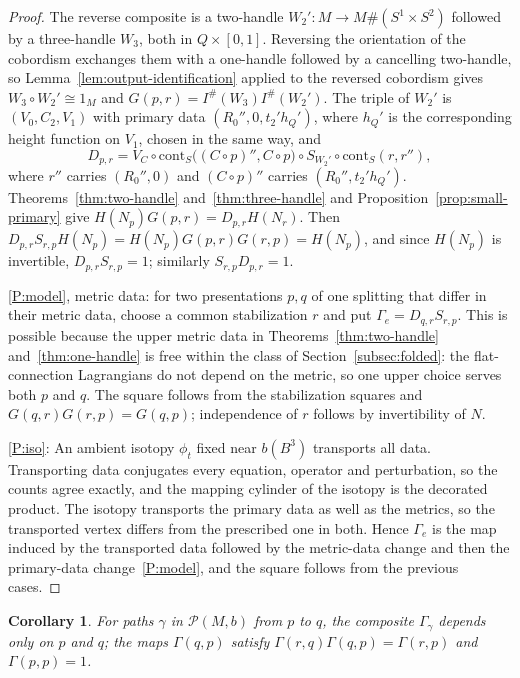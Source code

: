 \documentclass[11pt]{amsart}
\newtheorem{corollary}[theorem]{Corollary}
\theoremstyle{definition}
\theoremstyle{remark}
\theoremstyle{plain}
\numberwithin{equation}{section}
\newcommand{\cP}{\mathcal{P}}
\newcommand{\Ish}{I^{\#}}
\begin{document}
\begin{proof}
The reverse composite is a two-handle $W_2'\colon M\to M\#(S^1\times S^2)$
followed by a three-handle $W_3$, both in $Q\times[0,1]$. Reversing the
orientation of the cobordism exchanges them with a one-handle followed by a
cancelling two-handle, so Lemma~\ref{lem:output-identification} applied to the
reversed cobordism gives $W_3\circ W_2'\cong1_M$ and $G(p,r)=\Ish(W_3)\Ish(W_2')$.
The triple of $W_2'$ is $(V_0,C_2,V_1)$ with primary data $(R_0'',0,t_2'h_Q')$, where $h_Q'$ is the corresponding height function on $V_1$,
chosen in the same way, and
\[
D_{p,r}=V_C\circ \mathrm{cont}_S\bigl((C\circ p)'',C\circ p\bigr)\circ S_{W_2'}\circ
\mathrm{cont}_S(r,r''),
\]
where $r''$ carries $(R_0'',0)$ and $(C\circ p)''$ carries $(R_0'',t_2'h_Q')$.
Theorems~\ref{thm:two-handle} and~\ref{thm:three-handle} and
Proposition~\ref{prop:small-primary} give $H(N_p)G(p,r)=D_{p,r}H(N_r)$.
Then $D_{p,r}S_{r,p}H(N_p)=H(N_p)G(p,r)G(r,p)=
H(N_p)$, and since $H(N_p)$ is invertible, $D_{p,r}S_{r,p}=1$; similarly
$S_{r,p}D_{p,r}=1$.

\ref{P:model}, metric data: for two presentations $p,q$ of one
splitting that differ in their metric data, choose a common stabilization $r$ and put
$\Gamma_e=D_{q,r}S_{r,p}$. This is possible because the upper metric data in
Theorems~\ref{thm:two-handle} and~\ref{thm:one-handle} is free within the class
of Section~\ref{subsec:folded}: the flat-connection Lagrangians do not depend on
the metric, so one upper choice serves both $p$ and $q$. The square follows from the stabilization squares
and $G(q,r)G(r,p)=G(q,p)$; independence of $r$ follows by invertibility of
$N$.

\ref{P:iso}: An ambient isotopy $\phi_t$ fixed near $b(B^3)$ transports all
data. Transporting data conjugates every equation, operator and
perturbation, so the counts agree exactly, and the mapping cylinder of
the isotopy is the decorated product. The isotopy transports the primary data as well as the
metrics, so the transported vertex differs from the prescribed one in both.
Hence $\Gamma_e$ is the map induced by the transported data followed by the
metric-data change and then the primary-data change~\ref{P:model}, and the square
follows from the previous cases.
\end{proof}

\begin{corollary}\label{cor:transitive}
For paths $\gamma$ in $\cP(M,b)$ from $p$ to $q$, the composite
$\Gamma_\gamma$ depends only on $p$ and $q$; the maps $\Gamma(q,p)$ satisfy
$\Gamma(r,q)\Gamma(q,p)=\Gamma(r,p)$ and $\Gamma(p,p)=1$.
\end{corollary}
\end{document}

